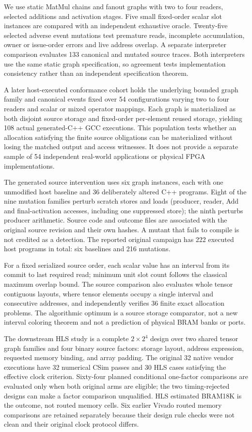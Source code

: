 \documentclass{article}
\begin{document}
We use static MatMul chains and fanout graphs with two to four readers, selected additions and activation stages. Five small fixed-order scalar slot instances are compared with an independent exhaustive oracle. Twenty-five selected adverse event mutations test premature reads, incomplete accumulation, owner or issue-order errors and live address overlap. A separate interpreter comparison evaluates 133 canonical and mutated source traces. Both interpreters use the same static graph specification, so agreement tests implementation consistency rather than an independent specification theorem.

A later host-executed conformance cohort holds the underlying bounded graph family and canonical events fixed over 54 configurations varying two to four readers and scalar or mixed operator mappings. Each graph is materialized as both disjoint source storage and fixed-order per-element reused storage, yielding 108 actual generated-C++ GCC executions. This population tests whether an allocation satisfying the finite source obligations can be materialized without losing the matched output and access witnesses. It does not provide a separate sample of 54 independent real-world applications or physical FPGA implementations.

The generated source intervention uses six graph instances, each with one unmodified host baseline and 36 deliberately altered C++ programs. Eight of the nine mutation families perturb scratch stores and loads (producer, reader, Add and final-activation accesses, including one suppressed store); the ninth perturbs producer arithmetic. Source code and outcome files are associated with the original source revision and their own hashes. A mutant that fails to compile is not credited as a detection. The reported original campaign has 222 executed host programs in total: six baselines and 216 mutations.


For a fixed serialized source order, each scalar value has an interval from its commit to last required read; minimum unit slot count follows the classical maximum overlap bound. The source comparison also evaluates whole tensor contiguous layouts, where tensor elements occupy a single interval and consecutive addresses, and independently verifies 36 finite exact allocation problems. The algorithmic optimum is a source storage comparator, not a new interval coloring theorem and not a prediction of physical BRAM banks or ports.

The downstream HLS study is a complete $2\times 2^4$ design over two shared tensor graph families and four binary source factors: storage layout, address expression, requested memory binding, and array padding. The original 32 native vendor executions have 32 numerical CSim passes and 30 HLS cases satisfying the effective clock criterion. Sixty-four planned conditional one-factor comparisons are evaluated only when both original arms are eligible; the two timing-rejected designs can make a factor comparison unqualified. HLS estimated BRAM18K is the outcome, not routed memory cells. Six earlier Vivado routed memory comparisons are retained separately because their design rule checks were not clean and their original clock protocol differs.
\end{document}
